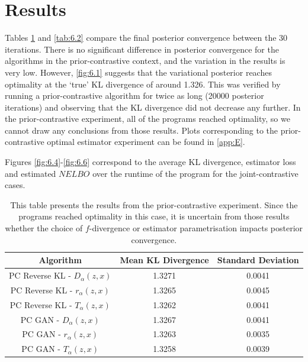 \documentclass[honours,12pt]{unswthesis}
\numberwithin{equation}{section}
\theoremstyle{definition}
\begin{document}
\section{Results}
Tables \ref{tab:6.1} and \ref{tab:6.2} compare the final posterior convergence between the 30 iterations. There is no significant difference in posterior convergence for the algorithms in the prior-contrastive context, and the variation in the results is very low. However, \autoref{fig:6.1} suggests that the variational posterior reaches optimality at the `true' KL divergence of around 1.326. This was verified by running a prior-contrastive algorithm for twice as long (20000 posterior iterations) and observing that the KL divergence did not decrease any further. In the prior-contrastive experiment, all of the programs reached optimality, so we cannot draw any conclusions from those results. Plots corresponding to the prior-contrastive optimal estimator experiment can be found in \autoref{app:E}.

Figures \ref{fig:6.4}-\ref{fig:6.6} correspond to the average KL divergence, estimator loss and estimated $NELBO$ over the runtime of the program for the joint-contrastive cases.
\begin{table}[h!]
\centering
\begin{tabular}{|c|c|c|}
\hline
Algorithm & Mean KL Divergence & Standard Deviation\\
\hline
PC Reverse KL - $D_\alpha(z,x)$ & 1.3271 & 0.0041\\
\hline
PC Reverse KL - $r_\alpha(z,x)$ & 1.3265 & 0.0045\\
\hline
PC Reverse KL - $T_\alpha(z,x)$ & 1.3262 & 0.0041\\
\hline
PC GAN - $D_\alpha(z,x)$ & 1.3267 & 0.0041\\
\hline
PC GAN - $r_\alpha(z,x)$ & 1.3263 & 0.0035\\
\hline
PC GAN - $T_\alpha(z,x)$ & 1.3258 & 0.0039\\
\hline
\end{tabular}
\caption{\small This table presents the results from the prior-contrastive experiment. Since the programs reached optimality in this case, it is uncertain from those results whether the choice of $f$-divergence or estimator parametrisation impacts posterior convergence.}
\label{tab:6.1}
\end{table}
\end{document}
